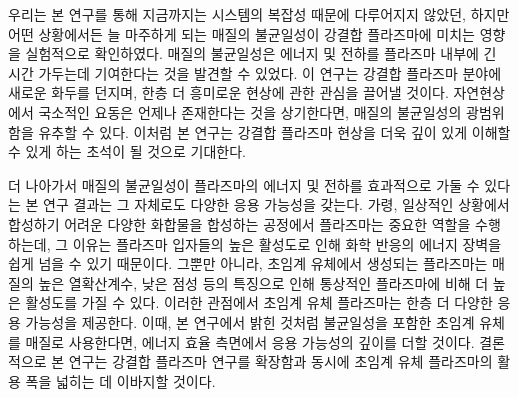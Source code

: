 우리는 본 연구를 통해 지금까지는 시스템의 복잡성 때문에 다루어지지 않았던, 하지만 어떤 상황에서든 늘 마주하게 되는 매질의 불균일성이 강결합 플라즈마에 미치는 영향을 실험적으로 확인하였다. 매질의 불균일성은 에너지 및 전하를 플라즈마 내부에 긴 시간 가두는데 기여한다는 것을 발견할 수 있었다. 이 연구는 강결합 플라즈마 분야에 새로운 화두를 던지며, 한층 더 흥미로운 현상에 관한 관심을 끌어낼 것이다. 자연현상에서 국소적인 요동은 언제나 존재한다는 것을 상기한다면, 매질의 불균일성의 광범위함을 유추할 수 있다. 이처럼 본 연구는 강결합 플라즈마 현상을 더욱 깊이 있게 이해할 수 있게 하는 초석이 될 것으로 기대한다.

더 나아가서 매질의 불균일성이 플라즈마의 에너지 및 전하를 효과적으로 가둘 수 있다는 본 연구 결과는 그 자체로도 다양한 응용 가능성을 갖는다. 가령, 일상적인 상황에서 합성하기 어려운 다양한 화합물을 합성하는 공정에서 플라즈마는 중요한 역할을 수행하는데, 그 이유는 플라즈마 입자들의 높은 활성도로 인해 화학 반응의 에너지 장벽을 쉽게 넘을 수 있기 때문이다. 그뿐만 아니라, 초임계 유체에서 생성되는 플라즈마는 매질의 높은 열확산계수, 낮은 점성 등의 특징으로 인해 통상적인 플라즈마에 비해 더 높은 활성도를 가질 수 있다. 이러한 관점에서 초임계 유체 플라즈마는 한층 더 다양한 응용 가능성을 제공한다. 이때, 본 연구에서 밝힌 것처럼 불균일성을 포함한 초임계 유체를 매질로 사용한다면, 에너지 효율 측면에서 응용 가능성의 깊이를 더할 것이다. 결론적으로 본 연구는 강결합 플라즈마 연구를 확장함과 동시에 초임계 유체 플라즈마의 활용 폭을 넓히는 데 이바지할 것이다.
